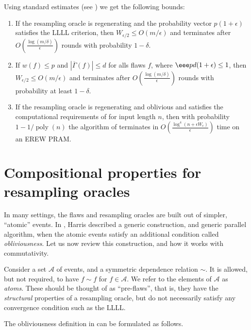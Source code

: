 \documentclass{toc}
\DeclareMathOperator{\poly}{poly}
\begin{document}
 Using standard estimates (see \cite{ParallelHarrisHaeupler, Kolmofocs, AIS}) we get the following bounds:
\begin{proposition}
\begin{enumerate} 
\item If the resampling oracle is regenerating and the probability vector $p (1+\epsilon)$ satisfies the LLLL criterion, then $W_{\epsilon/2} \leq O(m/\epsilon)$ and  terminates after $O( \frac{ \log (m/\delta)}{\epsilon})$ rounds with probability $1 - \delta$.
\item If $w(f) \leq p$ and $|\overline \Gamma(f)| \leq d$ for alls flaws $f$, where
$\eee p d (1+\epsilon) \leq 1$, then $W_{\epsilon/2} \leq O(m/\epsilon)$ and  terminates after $O( \frac{ \log (m/\delta)}{\epsilon})$ rounds with probability at least $1 - \delta$.
\item If the resampling oracle is regenerating and oblivious and satisfies the computational requirements of \cite{ParallelHarris} for input length $n$, then with probability $1 - 1/\poly(n)$ the algorithm of \cite{ParallelHarris} terminates in $O( \frac{ \log^4(n + \epsilon W_\epsilon) }{\epsilon})$ time on an EREW PRAM.
 \end{enumerate}  
\end{proposition}



\section{Compositional properties for resampling oracles} 
\label{comp-sec}
In many settings, the flaws and resampling oracles are built out of simpler, ``atomic'' events. In \cite{ParallelHarris}, Harris described a generic construction, and generic parallel algorithm, when the atomic events satisfy an additional
%
condition  %
called \emph{obliviousness}. Let us now review this construction, and how it works with commutativity. 

Consider a set $\mathcal A$ of events, and a symmetric dependence relation $\sim$. It is allowed, but not required, to have $f \sim f$ for $f \in \mathcal A$. We refer to the elements of $\mathcal A$ as \emph{atoms}. These should be thought of as ``pre-flaws'', that is, they have the \emph{structural}  properties of a resampling oracle, but do not necessarily satisfy any convergence condition such as the LLLL.  

The obliviousness definition in \cite{ParallelHarris} can be formulated 
as follows. %
\end{document}
